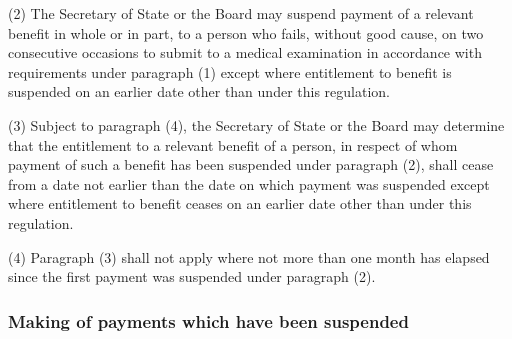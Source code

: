 \documentclass[12pt,a4paper]{article}
\begin{document}
(2) The Secretary of State 
or the Board  %
may suspend payment of a relevant benefit in whole or in part, to a person who fails, without good cause, on two consecutive occasions to submit to a medical examination in accordance with requirements under paragraph (1) except where entitlement to benefit is suspended on an earlier date other than under this regulation.

(3) Subject to paragraph (4), the Secretary of State 
or the Board  %
may determine that the entitlement to a relevant benefit of a person, in respect of whom payment of such a benefit has been suspended under paragraph (2), shall cease from a date not earlier than the date on which payment was suspended except where entitlement to benefit ceases on an earlier date other than under this regulation.

(4) Paragraph (3) shall not apply where not more than one month has elapsed since the first payment was suspended under paragraph (2).


\subsubsection[20. Making of payments which have been suspended]{Making of payments which have been suspended}
\end{document}
